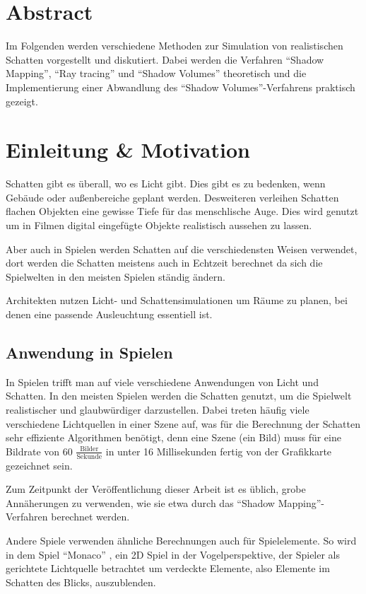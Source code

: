 \section{Abstract}

Im Folgenden werden verschiedene Methoden zur Simulation von realistischen Schatten
vorgestellt und diskutiert. Dabei werden die Verfahren "`Shadow Mapping"',
"`Ray tracing"' und "`Shadow Volumes"' theoretisch und die Implementierung
einer Abwandlung des "`Shadow Volumes"'-Verfahrens praktisch gezeigt.


\section{Einleitung \& Motivation}

Schatten gibt es überall, wo es Licht gibt. Dies gibt es zu bedenken, wenn
Gebäude oder außenbereiche geplant werden.
Desweiteren verleihen Schatten flachen Objekten eine gewisse Tiefe für das menschlische Auge.
Dies wird genutzt um in Filmen digital eingefügte Objekte realistisch aussehen zu lassen.

Aber auch in Spielen werden Schatten auf die verschiedensten Weisen verwendet, dort werden
die Schatten meistens auch in Echtzeit berechnet da sich die Spielwelten in den meisten Spielen
ständig ändern.

Architekten nutzen Licht- und Schattensimulationen um Räume zu planen, bei denen eine passende
Ausleuchtung essentiell ist.

\subsection{Anwendung in Spielen}

In Spielen trifft man auf viele verschiedene Anwendungen von Licht und Schatten. In den meisten
Spielen werden die Schatten genutzt, um die Spielwelt realistischer und glaubwürdiger darzustellen.
Dabei treten häufig viele verschiedene Lichtquellen in einer Szene auf, was für die Berechnung der
Schatten sehr effiziente Algorithmen benötigt, denn eine Szene (ein Bild) muss für eine Bildrate
von 60 $\frac{\text{Bilder}}{\text{Sekunde}}$ in unter 16 Millisekunden fertig von der Grafikkarte gezeichnet sein.

Zum Zeitpunkt der Veröffentlichung dieser Arbeit ist es üblich, grobe Annäherungen zu verwenden,
wie sie etwa durch das "`Shadow Mapping"'-Verfahren berechnet werden.

Andere Spiele verwenden ähnliche Berechnungen auch für Spielelemente. So wird in dem Spiel "`Monaco"' \cite{monaco2014},
ein 2D Spiel in der Vogelperspektive, der Spieler als gerichtete Lichtquelle betrachtet um verdeckte
Elemente, also Elemente im Schatten des Blicks, auszublenden.


